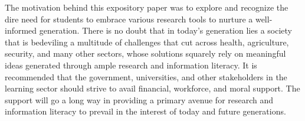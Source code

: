 \documentclass[
    a4paper,
    stu,
    12pt,
   noextraspace,
   floatsintext,
]{APA7}
\begin{document}
The motivation behind this expository paper was to explore and recognize the dire need for students to embrace various research tools to nurture a well-informed generation. There is no doubt that in today's generation lies a society that is bedeviling a multitude of challenges that cut across health, agriculture, security, and many other sectors, whose solutions squarely rely on meaningful ideas generated through ample research and information literacy. It is recommended that the government, universities, and other stakeholders in the learning sector should strive to avail financial, workforce, and moral support. The support will go a long way in providing a primary avenue for research and information literacy to prevail in the interest of today and future generations.

\printbibliography
\end{document}
